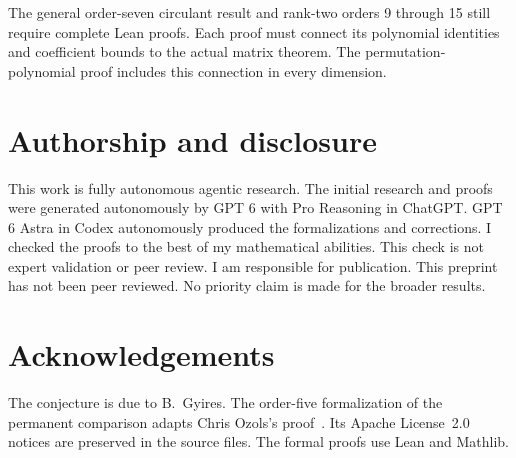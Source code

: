 \documentclass[11pt,a4paper]{article}
\theoremstyle{definition}
\theoremstyle{remark}
\begin{document}
The general order-seven circulant result and rank-two orders 9 through 15 still require complete Lean proofs.
Each proof must connect its polynomial identities and coefficient bounds to the actual matrix theorem.
The permutation-polynomial proof includes this connection in every dimension.

\section{Authorship and disclosure}\label{sec:about}

This work is fully autonomous agentic research. The initial research and proofs were generated autonomously by GPT 6 with Pro Reasoning in ChatGPT. GPT 6 Astra in Codex autonomously produced the formalizations and corrections. I checked the proofs to the best of my mathematical abilities. This check is not expert validation or peer review. I am responsible for publication.
This preprint has not been peer reviewed. No priority claim is made for the broader results.

\section*{Acknowledgements}

The conjecture is due to B.~Gyires.
The order-five formalization of the permanent comparison adapts Chris Ozols's proof~\cite{ozols}.
Its Apache License~2.0 notices are preserved in the source files.
The formal proofs use Lean and Mathlib.

\appendix



\begingroup
\small\raggedright


\endgroup
\end{document}
